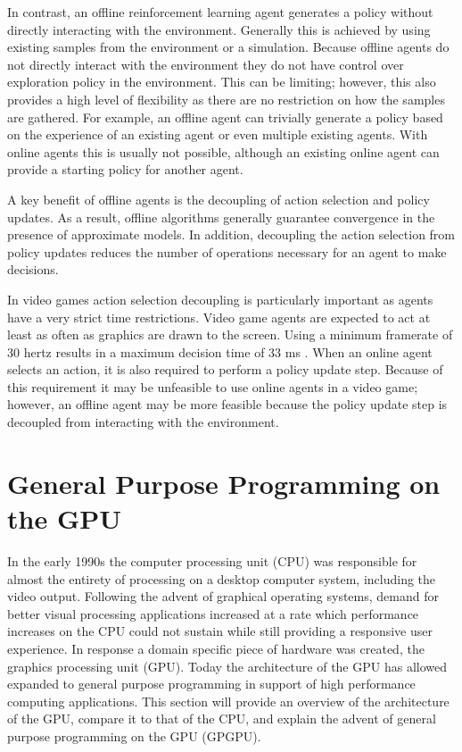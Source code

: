 In contrast, an offline reinforcement learning agent generates a policy without directly interacting with the environment. Generally this is achieved by using existing samples from the environment or a simulation. Because offline agents do not directly interact with the environment they do not have control over exploration policy in the environment. This can be limiting; however, this also provides a high level of flexibility as there are no restriction on how the samples are gathered. For example, an offline agent can trivially generate a policy based on the experience of an existing agent or even multiple existing agents. With online agents this is usually not possible, although an existing online agent can provide a starting policy for another agent.

A key benefit of offline agents is the decoupling of action selection and policy updates. As a result, offline algorithms generally guarantee convergence in the presence of approximate models. In addition, decoupling the action selection from policy updates reduces the number of operations necessary for an agent to make decisions. 

In video games action selection decoupling is particularly important as agents have a very strict time restrictions. Video game agents are expected to act at least as often as graphics are drawn to the screen. Using a minimum framerate of 30 hertz results in a maximum decision time of 33 ms \cite{game:ai:lecture}. When an online agent selects an action, it is also required to perform a policy update step. Because of this requirement it may be unfeasible to use online agents in a video game; however, an offline agent may be more feasible because the policy update step is decoupled from interacting with the environment.

\section{General Purpose Programming on the GPU}

In the early 1990s the computer processing unit (CPU) was responsible for almost the entirety of processing on a desktop computer system, including the video output. Following the advent of graphical operating systems, demand for better visual processing applications increased at a rate which performance increases on the CPU could not sustain while still providing a responsive user experience. In response a domain specific piece of hardware was created, the graphics processing unit (GPU). Today the architecture of the GPU has allowed expanded to general purpose programming in support of high performance computing applications. This section will provide an overview of the architecture of the GPU, compare it to that of the CPU, and explain the advent of general purpose programming on the GPU (GPGPU).


